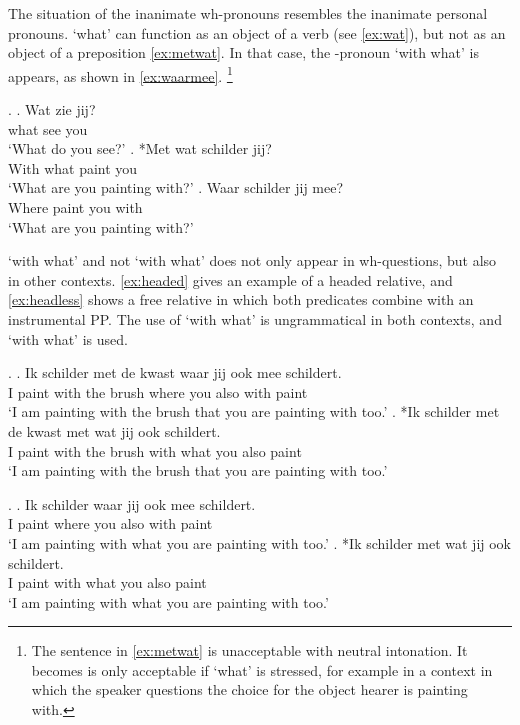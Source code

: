 \documentclass{article}
\begin{document}
The situation of the inanimate wh-pronouns resembles the inanimate personal pronouns.  `what' can function as an object of a verb (see \ref{ex:wat}), but not as an object of a preposition \ref{ex:metwat}. In that case, the -pronoun  `with what' is appears, as shown in \ref{ex:waarmee}.
\footnote{The sentence in \ref{ex:metwat} is unacceptable with neutral intonation. It becomes is only acceptable if  `what' is stressed, for example in a context in which the speaker questions the choice for the object hearer is painting with.}

\ex.
\ag. Wat zie jij?\\
 what see you\\
 `What do you see?'\label{ex:wat}
\bg. *Met wat schilder jij?\\
 With what paint you\\
 `What are you painting with?'\label{ex:metwat}
\bg. Waar schilder jij mee?\\
 Where paint you with\\
 `What are you painting with?'\label{ex:waarmee}

 `with what' and not  `with what' does not only appear in wh-questions, but also in other contexts. \ref{ex:headed} gives an example of a headed relative, and \ref{ex:headless} shows a free relative in which both predicates combine with an instrumental PP. The use of  `with what' is ungrammatical in both contexts, and  `with what' is used.

\ex.\label{ex:headed}
\ag. Ik schilder met de kwast waar jij ook mee schildert.\\
 I paint with the brush where you also with paint\\
 `I am painting with the brush that you are painting with too.'
\bg. *Ik schilder met de kwast met wat jij ook schildert.\\
 I paint with the brush with what you also paint\\
 `I am painting with the brush that you are painting with too.'

 \ex.\label{ex:headless}
 \ag. Ik schilder waar jij ook mee schildert.\\
  I paint where you also with paint\\
  `I am painting with what you are painting with too.'
 \bg. *Ik schilder met wat jij ook schildert.\\
  I paint with what you also paint\\
  `I am painting with what you are painting with too.'
\end{document}
